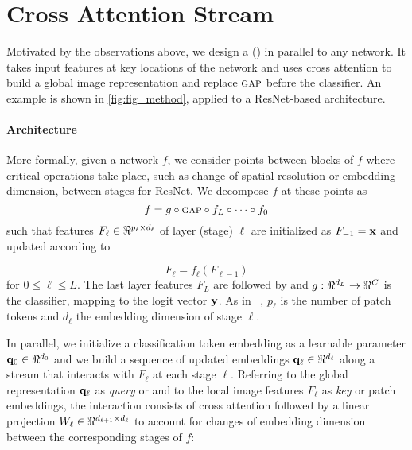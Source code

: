 \section{Cross Attention Stream}

\label{sec:ca_design}
Motivated by the observations above, we design a \emph{\OURS} (\emph{\Ours}) in parallel to any 
network. It takes input features at key locations of the network and uses cross attention to build 
a global image representation and replace ${\textsc{gap}}$ before the classifier. An example is shown in 
\autoref{fig:fig_method}, applied to a ResNet-based architecture.

\paragraph{Architecture}
More formally, given a network $f$, we consider points between blocks of $f$ where critical 
operations take place, such as change of spatial resolution or embedding dimension, \eg between 
stages for ResNet. We decompose $f$ at these points as
\begin{equation}
	f = g \circ {\textsc{gap}} \circ f_L \circ \dots \circ f_0
\label{eq:f-decomp}
\end{equation}
such that features $F_\ell \in \real^{p_\ell \times d_\ell}$ of layer (stage) $\ell$ are 
initialized as $F_{-1} = \mathbf{x}$ and updated according to

\begin{equation}
	F_\ell = f_\ell(F_{\ell-1})
\label{eq:f-layer}
\end{equation}
for $0 \le \ell \le L$. The last layer features $F_L$ are followed by \gap and $g: \real^{d_L} \to 
\real^C$ is the classifier, mapping to the logit vector $\mathbf{y}$. As in ~, 
$p_\ell$ is the number of patch tokens and $d_\ell$ the embedding dimension of stage $\ell$.

In parallel, we initialize a classification token embedding as a learnable parameter $\vq_0 \in 
\real^{d_0}$ and we build a sequence of updated embeddings $\vq_\ell \in \real^{d_\ell}$ along a 
stream that interacts with $F_\ell$ at each stage $\ell$. Referring to the global representation 
$\mathbf{q}_\ell$ as \emph{query} or \cls and to the local image features $F_\ell$ as \emph{key} or patch 
embeddings, the interaction consists of cross attention followed by a linear projection $W_\ell \in 
\real^{d_{\ell+1} \times d_\ell}$ to account for changes of embedding dimension between the 
corresponding stages of $f$:


